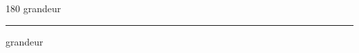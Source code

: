 
\begin{frame}
\begin{center}
\begin{turn}{180}
{\fontsize{2.5cm}{1em}\selectfont grandeur}
\end{turn}
\vspace{1em}\par  
\hrule
\vspace{1em}\par  
{\fontsize{2.5cm}{1em}\selectfont grandeur}
\end{center}
\end{frame}
